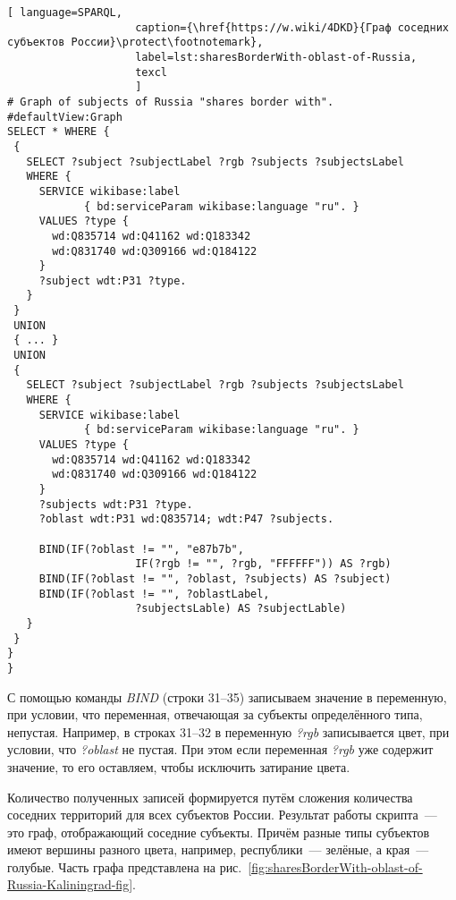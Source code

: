 \lstset{numbers=left, firstnumber=1, frame=single}
\begin{lstlisting}[ language=SPARQL, 
                    caption={\href{https://w.wiki/4DKD}{Граф соседних субъектов России}\protect\footnotemark},
                    label=lst:sharesBorderWith-oblast-of-Russia,
                    texcl 
                    ]
# Graph of subjects of Russia "shares border with". 
#defaultView:Graph
SELECT * WHERE {
 {
   SELECT ?subject ?subjectLabel ?rgb ?subjects ?subjectsLabel 
   WHERE {
     SERVICE wikibase:label 
            { bd:serviceParam wikibase:language "ru". }
     VALUES ?type {
       wd:Q835714 wd:Q41162 wd:Q183342
       wd:Q831740 wd:Q309166 wd:Q184122
     }
     ?subject wdt:P31 ?type.
   }
 }
 UNION
 { ... }
 UNION
 {
   SELECT ?subject ?subjectLabel ?rgb ?subjects ?subjectsLabel 
   WHERE {
     SERVICE wikibase:label 
            { bd:serviceParam wikibase:language "ru". }
     VALUES ?type {
       wd:Q835714 wd:Q41162 wd:Q183342
       wd:Q831740 wd:Q309166 wd:Q184122
     }
     ?subjects wdt:P31 ?type.
     ?oblast wdt:P31 wd:Q835714; wdt:P47 ?subjects.
     
     BIND(IF(?oblast != "", "e87b7b", 
                    IF(?rgb != "", ?rgb, "FFFFFF")) AS ?rgb)
     BIND(IF(?oblast != "", ?oblast, ?subjects) AS ?subject)
     BIND(IF(?oblast != "", ?oblastLabel, 
                    ?subjectsLable) AS ?subjectLable)
   }
 }
}
}
\end{lstlisting}%

С помощью команды \textit{BIND} (строки 31--35) записываем значение в переменную, при условии, что переменная, отвечающая за субъекты определённого типа, непустая. Например, в строках 31--32 в переменную \textit{?rgb} записывается цвет, при условии, что \textit{?oblast} не пустая. При этом если переменная \textit{?rgb} уже содержит значение, то его оставляем, чтобы исключить затирание цвета.

Количество полученных записей формируется путём сложения количества соседних территорий для всех субъектов России. Результат работы скрипта~--- это граф, отображающий соседние субъекты. Причём разные типы субъектов имеют вершины разного цвета, например, республики~--- зелёные, а края~--- голубые. Часть графа представлена на рис.~\ref{fig:sharesBorderWith-oblast-of-Russia-Kaliningrad-fig}.

